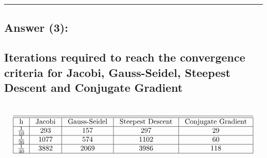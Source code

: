 \documentclass[11pt]{article}
\begin{document}
    \begin{center}
    \end{center}
    { \hspace*{\fill} \\}
    
    \begin{center}
    \end{center}
    { \hspace*{\fill} \\}
    
    \begin{center}\rule{0.5\linewidth}{0.5pt}\end{center}

    \hypertarget{answer-3}{%
\subsection{Answer (3):}\label{answer-3}}

    \hypertarget{iterations-required-to-reach-the-convergence-criteria-for-jacobi-gauss-seidel-steepest-descent-and-conjugate-gradient}{%
\subsection{Iterations required to reach the convergence criteria for
Jacobi, Gauss-Seidel, Steepest Descent and Conjugate
Gradient}\label{iterations-required-to-reach-the-convergence-criteria-for-jacobi-gauss-seidel-steepest-descent-and-conjugate-gradient}}

    \[
\begin{aligned}
& \text {}\\
&\begin{array}{|c|c|c|c|c|}
\hline \hline \text { h } & \text { Jacobi } & \text { Gauss-Seidel } & \text { Steepest Descent }  & \text { Conjugate Gradient } \\
\hline \frac{1}{10} & 293 & 157 & 297 & 29\\
\hline
\frac{1}{20} & 1077 & 574 & 1102 & 60\\
\hline
\frac{1}{40} & 3882 & 2069 & 3986 & 118\\
\hline
\end{array}
\end{aligned}
\]
\end{document}
